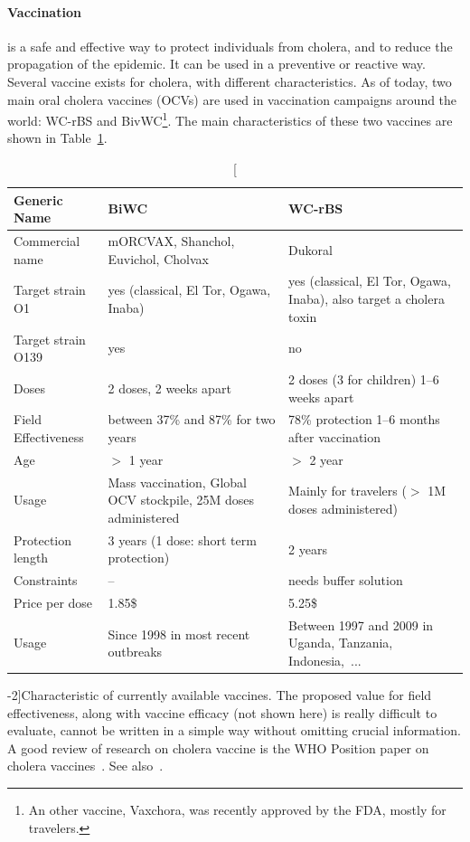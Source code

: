 \paragraph{Vaccination} is a safe and effective way to protect individuals from cholera, and to reduce the propagation of the epidemic. It can be used in a preventive or reactive way. Several vaccine exists for cholera, with different characteristics. As of today, two main oral cholera vaccines (OCVs) are used in vaccination campaigns around the world: WC-rBS and BivWC\footnote[][-3\baselineskip]{An other vaccine, Vaxchora, was recently approved by the FDA, mostly for travelers.}. The main characteristics of these two vaccines are shown in Table~\ref{tab:vacc}.

\begin{table}[h]
\centering\small
\label{tab:prior}
\begin{tabular}{lp{40mm}p{40mm}}
\toprule
Generic Name &  BiWC & WC-rBS\\ 
\midrule
Commercial name   &  mORCVAX, Shanchol,  Euvichol, Cholvax & Dukoral  \\
Target strain O1 &   yes (classical, El Tor, Ogawa, Inaba)& yes (classical, El Tor, Ogawa, Inaba), also  target a cholera toxin  \\
Target strain O139   &  yes &      no     \\
Doses   &  2 doses, 2 weeks apart & 2 doses (3 for children) 1--6 weeks apart  \\
Field Effectiveness  & between 37\% and 87\% for two years & 78\% protection 1--6 months after vaccination\\
Age   &  $>$ 1 year & $>$ 2 year      \\
Usage & Mass vaccination, Global OCV stockpile, 25M doses administered & Mainly for travelers ($>$ 1M doses administered)\\
Protection length & 3 years (1 dose: short term protection) & 2 years\\
Constraints & -- & needs buffer solution\\
Price per dose & 1.85\$ & 5.25\$ \\ 
Usage & Since 1998 in most recent outbreaks & Between 1997 and 2009 in Uganda, Tanzania, Indonesia,~... \\
\bottomrule
\end{tabular}
\caption[Characteristic of currently available vaccines][-2\baselineskip]{Characteristic of currently available vaccines. The proposed value for field effectiveness, along with vaccine efficacy (not shown here) is really difficult to evaluate, cannot be written in a simple way without omitting crucial information. A good review of research on cholera vaccine is the WHO Position paper on cholera vaccines~. See also~\textcite{WHO:BackgroundPaperWholeCell:2017,Azman:PopulationLevelEffectCholera:2016,Luquero:FirstOutbreakResponse:2013,WHO:BackgroundPaperIntegration:2009,Luquero:UseVibrioCholerae:2014,Qadri:EfficacySingledoseRegimen:2018,Bi:ProtectionCholeraKilled:2017,Azman:ImpactOneDoseTwoDose:2015,Tohme:OralCholeraVaccine:2015}.}
\label{tab:vacc}
\end{table}


